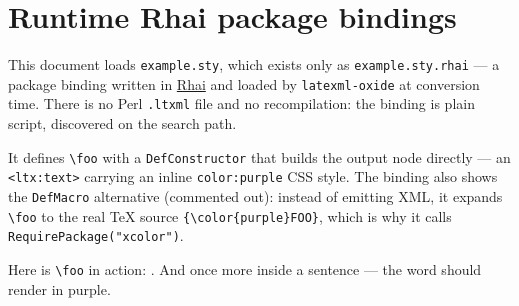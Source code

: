 \documentclass{article}
\begin{document}
\section*{Runtime Rhai package bindings}

This document loads \texttt{example.sty}, which exists only as
\texttt{example.sty.rhai} --- a package binding written in
\href{https://rhai.rs}{Rhai} and loaded by \texttt{latexml-oxide} at
conversion time. There is no Perl \texttt{.ltxml} file and no recompilation:
the binding is plain script, discovered on the search path.

It defines \verb|\foo| with a \texttt{DefConstructor} that builds the output
node directly --- an \verb|<ltx:text>| carrying an inline \verb|color:purple|
CSS style. The binding also shows the \texttt{DefMacro} alternative (commented
out): instead of emitting XML, it expands \verb|\foo| to the real TeX source
\verb|{\color{purple}FOO}|, which is why it calls \texttt{RequirePackage("xcolor")}.

Here is \verb|\foo| in action: \foo{}. And once more inside a sentence --- the
word \foo{} should render in purple.
\end{document}
